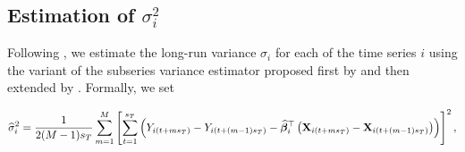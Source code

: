 \documentclass[a4paper,12pt]{article}
\begin{document}
\subsection{Estimation of  $\sigma^2_i$}\label{subsec:para:lrv}

Following \cite{Kim2016}, we estimate the long-run variance $\sigma_i$ for each of the time \linebreak series $i$ using the variant of the subseries variance estimator proposed first by \linebreak \cite{Carlstein1986} and then extended by \cite{WuZhao2007}. Formally, we set
\begin{small}
\begin{align}\label{eq:lrv}
\widehat{\sigma}_i^2 = \frac{1}{2(M-1)s_T}\sum_{m=1}^M \left[\sum_{t = 1}^{s_T} \left(Y_{i(t + ms_T)} - Y_{i(t + (m-1)s_T)} - \widehat{\bm{\beta}}_i^\top\left(\mathbf{X}_{i(t+ms_T)} - \mathbf{X}_{i(t+(m-1)s_T)}\right) \right)\right]^2,
\end{align}
\end{small}
\end{document}
